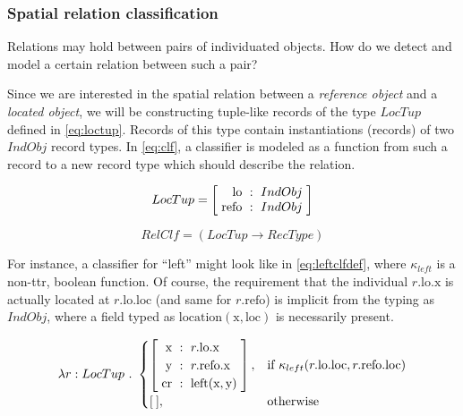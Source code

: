 \subsubsection{Spatial relation classification}

Relations may hold between pairs of individuated objects.
How do we detect and model a certain relation between such a pair?

Since we are interested in the spatial relation between a \textit{reference object} and a \textit{located object}, we will be constructing tuple-like records of the type $LocTup$ defined in \autoref{eq:loctup}.
Records of this type contain instantiations (records) of two $IndObj$ record types.
In \autoref{eq:clf}, a classifier is modeled as a function from such a record to a new record type which should describe the relation.

\begin{equation}\label{eq:loctup}
LocTup = \rec{
    \text{lo} &:& IndObj \\
    \text{refo} &:& IndObj \\
    }
\end{equation}

\begin{equation}\label{eq:clf}
RelClf = ( LocTup \rightarrow RecType )
\end{equation}

For instance, a classifier for ``left'' might look like in \autoref{eq:leftclfdef}, where $\kappa_{left}$ is a non-\gls{ttr}, boolean function.
Of course, the requirement that the individual $r.\text{lo}.\text{x}$ is actually located at $r.\text{lo}.\text{loc}$ (and same for $r.\text{refo}$) is implicit from the typing as $IndObj$, where a field typed as $\text{location}(\text{x}, \text{loc})$ is necessarily present.

\begin{equation}\label{eq:leftclfdef}
\lambda r : LocTup \ .\ 
\begin{cases}
\rec{
    \text{x} &:& r.\text{lo}.\text{x} \\
    \text{y} &:& r.\text{refo}.\text{x} \\
    \text{cr} &:& \text{left}(\text{x}, \text{y}) \\
},
& \text{if } \kappa_{left}(r.\text{lo}.\text{loc}, r.\text{refo}.\text{loc}) \\
[\:], & \text{otherwise}
\end{cases}
\end{equation}

